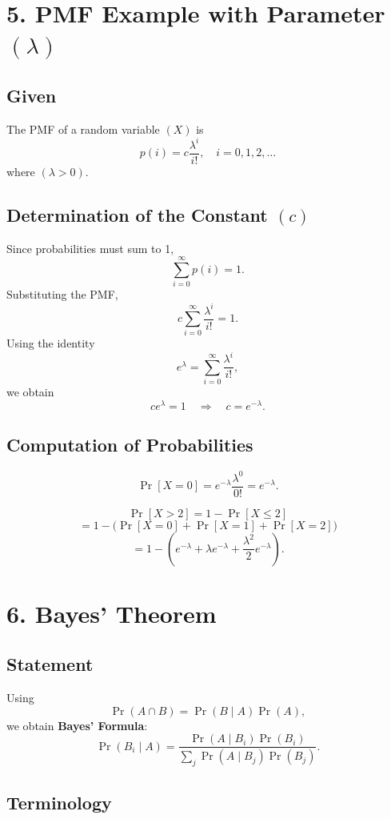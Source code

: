\documentclass[11pt]{article}
\begin{document}
\section*{5. PMF Example with Parameter $(\lambda)$}

\subsection*{Given}

The PMF of a random variable $(X)$ is
\[
p(i) = c \frac{\lambda^i}{i!}, \quad i = 0,1,2,\dots
\]
where $(\lambda > 0)$.

\subsection*{Determination of the Constant $(c)$}

Since probabilities must sum to 1,
\[
\sum_{i=0}^{\infty} p(i) = 1.
\]
Substituting the PMF,
\[
c \sum_{i=0}^{\infty} \frac{\lambda^i}{i!} = 1.
\]
Using the identity
\[
e^{\lambda} = \sum_{i=0}^{\infty} \frac{\lambda^i}{i!},
\]
we obtain
\[
c e^{\lambda} = 1 \quad \Rightarrow \quad c = e^{-\lambda}.
\]

\subsection*{Computation of Probabilities}

\[
\Pr[X = 0] = e^{-\lambda} \frac{\lambda^0}{0!} = e^{-\lambda}.
\]

\[
\Pr[X > 2] = 1 - \Pr[X \le 2]
\]
\[
= 1 - \big(\Pr[X=0] + \Pr[X=1] + \Pr[X=2]\big)
\]
\[
= 1 - \left(e^{-\lambda} + \lambda e^{-\lambda} + \frac{\lambda^2}{2} e^{-\lambda}\right).
\]

\section*{6. Bayes’ Theorem}

\subsection*{Statement}

Using
\[
\Pr(A \cap B) = \Pr(B \mid A)\Pr(A),
\]
we obtain \textbf{Bayes’ Formula}:
\[
\Pr(B_i \mid A) =
\frac{\Pr(A \mid B_i)\Pr(B_i)}
{\sum_j \Pr(A \mid B_j)\Pr(B_j)}.
\]

\subsection*{Terminology}
\end{document}
